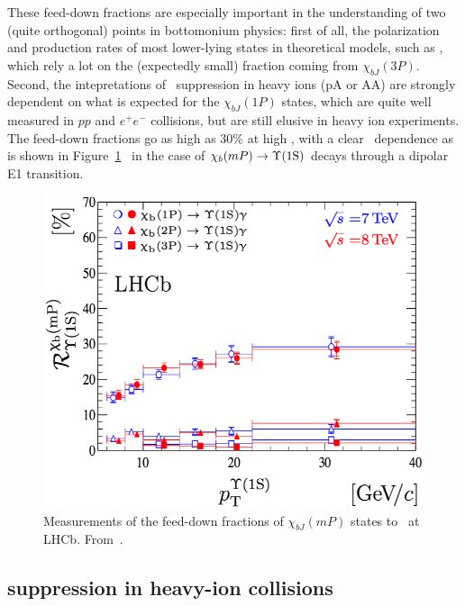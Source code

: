 These feed-down fractions are especially important in the
understanding of two (quite orthogonal) points in bottomonium physics:
first of all, the polarization and production rates of most
lower-lying states in theoretical models, such as \PgUc, which rely a
lot on the (expectedly small) fraction coming from
$\chi_{bJ}(3P)$. Second, the intepretations of \PgUa~suppression in heavy ions (pA or
AA) are strongly dependent on what is expected for the $\chi_{bJ}(1P)$
states, which are quite well measured in $pp$ and $e^{+}e^{-}$
collisions, but are still elusive in heavy ion experiments. The
feed-down fractions go as high as 30\% at high \pt, with a clear
\pt~dependence as is shown in Figure~\ref{fig:feeddown_lhcb}~\cite{chib3p_lhcb} in the case of $\chi_{b}(mP) \to \Upsilon\mathrm{(1S)}$
decays through a dipolar E1 transition. 


\begin{figure}
\begin{center}
  \includegraphics[height=0.35\textheight]{Chapters/pQuarkonia/chibfeeddown.png}
  \caption{Measurements of the feed-down fractions of $\chi_{bJ}(mP)$
    states to \PgUa~at LHCb. From~\cite{chib3p_lhcb}.}
  \label{fig:feeddown_lhcb}
\end{center}
\end{figure}



\subsection{\texorpdfstring{\PgU}{Y} suppression in heavy-ion
  collisions}

